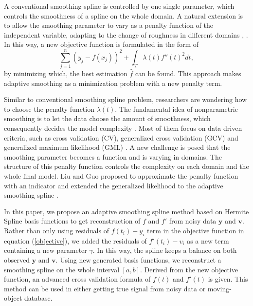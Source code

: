 A conventional smoothing spline is controlled by one single parameter, which controls the smoothness of a spline on the whole domain. A natural extension is to allow the smoothing parameter to vary as a penalty function of the independent variable, adapting to the change of roughness  in different domains \cite{silverman1985some}, \cite{donoho1995wavelet}. In this way, a new objective function is formulated in the form of 
\begin{equation}\label{objective}
\sum_{j=1}^{n}(y_j-f(x_j))^2+\int_T\lambda(t) f''(t)^2dt,
\end{equation}
by minimizing which, the best estimation $\hat{f}$ can be found. This approach makes adaptive smoothing as a minimization problem with a new penalty term. 

Similar to conventional smoothing spline problem, researchers are wondering how to choose the penalty function $\lambda(t)$. The fundamental idea of nonparametric smoothing is to let the data choose the amount of smoothness, which consequently decides the model complexity \cite{gu1998model}. Most of them focus on data driven criteria, such as cross validation (CV), generalized cross validation (GCV) \cite{craven1978smoothing} and generalized maximum likelihood (GML) \cite{wahba1985comparison}. A new challenge is posed that the smoothing parameter becomes a function and is varying in domains. The structure of this penalty function controls the complexity on each domain and the whole final model. Liu and Guo proposed to approximate the penalty function with an indicator and extended the generalized likelihood to the adaptive smoothing spline \cite{liu2010data}.


In this paper, we propose an adaptive smoothing spline method based on Hermite Spline basis functions to get reconstruction of $f$ and $f'$ from noisy data $\mathbf{y}$ and $\mathbf{v}$. Rather than only using residuals of $f(t_i)-y_i$ term in the objective function in equation (\ref{objective}), we added the residuals of $f'(t_i)-v_i$ as a new term containing a new parameter $\gamma$. In this way, the spline keeps a balance on both observed $\mathbf{y}$ and $\mathbf{v}$. Using new generated basis functions, we reconstruct a smoothing spline on the whole interval $[a,b]$. Derived from the new objective function, an advanced cross validation formula of $f(t)$ and $f'(t)$ is given. This method can be used in either getting true signal from noisy data or moving-object database. 


